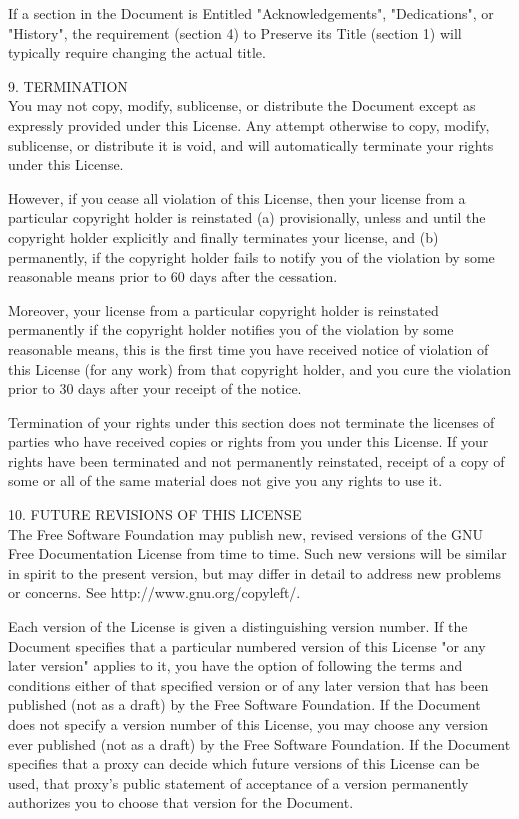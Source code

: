 \documentclass[oneside,12pt]{memoir} %
\begin{document}
If a section in the Document is Entitled "Acknowledgements", "Dedications", or "History", the requirement (section 4) to Preserve its Title (section 1) will typically require changing the actual title.

9. TERMINATION\\

You may not copy, modify, sublicense, or distribute the Document except as expressly provided under this License. Any attempt otherwise to copy, modify, sublicense, or distribute it is void, and will automatically terminate your rights under this License.

However, if you cease all violation of this License, then your license from a particular copyright holder is reinstated (a) provisionally, unless and until the copyright holder explicitly and finally terminates your license, and (b) permanently, if the copyright holder fails to notify you of the violation by some reasonable means prior to 60 days after the cessation.

Moreover, your license from a particular copyright holder is reinstated permanently if the copyright holder notifies you of the violation by some reasonable means, this is the first time you have received notice of violation of this License (for any work) from that copyright holder, and you cure the violation prior to 30 days after your receipt of the notice.

Termination of your rights under this section does not terminate the licenses of parties who have received copies or rights from you under this License. If your rights have been terminated and not permanently reinstated, receipt of a copy of some or all of the same material does not give you any rights to use it.

10. FUTURE REVISIONS OF THIS LICENSE\\

The Free Software Foundation may publish new, revised versions of the GNU Free Documentation License from time to time. Such new versions will be similar in spirit to the present version, but may differ in detail to address new problems or concerns. See http://www.gnu.org/copyleft/.

Each version of the License is given a distinguishing version number. If the Document specifies that a particular numbered version of this License "or any later version" applies to it, you have the option of following the terms and conditions either of that specified version or of any later version that has been published (not as a draft) by the Free Software Foundation. If the Document does not specify a version number of this License, you may choose any version ever published (not as a draft) by the Free Software Foundation. If the Document specifies that a proxy can decide which future versions of this License can be used, that proxy's public statement of acceptance of a version permanently authorizes you to choose that version for the Document.
\end{document}
